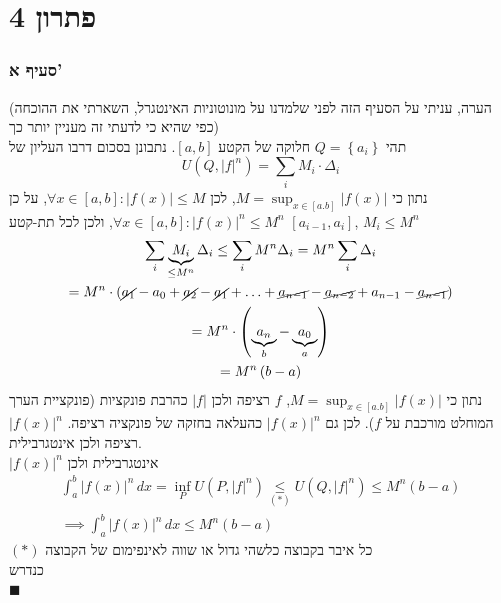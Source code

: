\documentclass[12pt, titlepage]{article}
\begin{document}
\part*{פתרון 4}
\section*{סעיף א'}
(הערה, עניתי על הסעיף הזה לפני שלמדנו על מונוטוניות האינטגרל, השארתי את ההוכחה כפי שהיא כי לדעתי זה מעניין יותר כך)\\
תהי  $Q=\left\{ a_{i} \right\}$ חלוקה של הקטע $\left[ a,b \right]$. נתבונן בסכום דרבו העליון של 
$$
U\left( Q,\left| f \right|^{n}  \right)  =  \sum_{i}M_{i}\cdot\Delta_{i} 
$$
נתון כי $M=\sup_{x \in \left[ a.b \right]}\left| f\left( x \right) \right|$, לכן $\forall x \in \left[ a,b \right]:\left| f\left( x \right) \right|\leq M$, על כן $\forall x \in \left[ a,b \right]:\left| f\left( x \right) \right|^{n}\leq M^{n}$, ולכן לכל תת-קטע $\left[ a_{i-1},a_{i} \right]$, $M_{i}\leq M^{n}$
\begin{gather*}
	\sum_{i}\underbrace{M_{i}}_{ \leq M^{n} }\Delta_{i} \leq \sum_{i}M^{n}\Delta_{i}= M^{n}\sum_{i}\Delta_{i}  \\
	= M^{n} \cdot\left( \cancel{a_{1}}-a_{0}+\cancel{a_{2}}-\cancel{a_{1}}+\ldots+\cancel{a_{n-1}}-\cancel{a_{n-2}}+a_{n-1}-\cancel{a_{n-1}} \right) \\
	=M^{n}\cdot\left( \underbrace{ a_{n} }_{ b }-\underbrace{ a_{0} }_{ a } \right)  \\
	= M^{n}\left( b-a \right) 
\end{gather*}
נתון כי $M=\sup_{x \in \left[ a.b \right]}\left| f\left( x \right) \right|$, $f$ רציפה ולכן $\left| f \right|$ כהרבת פונקציות (פונקציית הערך המוחלט מורכבת על $f$). לכן גם $\left| f\left( x \right) \right|^{n}$ כהעלאה בחזקה של פונקציה רציפה. $\left| f\left( x \right) \right|^{n}$ רציפה ולכן אינטגרבילית.\\
$\left| f\left( x \right) \right|^{n}$ אינטגרבילית ולכן 
\begin{gather*}
	\int_{a}^{b} \left| f\left( x \right)  \right| ^{n} \, dx = \inf_{P}U\left( P,\left| f \right| ^{n}\right)\underset{ \left( * \right)  }{ \leq } U\left( Q,\left| f \right| ^{n} \right)\leq M^{n}\left( b-a \right) \\
	  \implies \boxed{	\int_{a}^{b} \left| f\left( x \right)  \right|^{n}  \, dx \leq M^{n}\left( b-a \right) }
\end{gather*}
$\left( * \right)$ כל איבר בקבוצה כלשהי גדול או שווה לאינפימום של הקבוצה\\
כנדרש\\
$\blacksquare$
\end{document}
